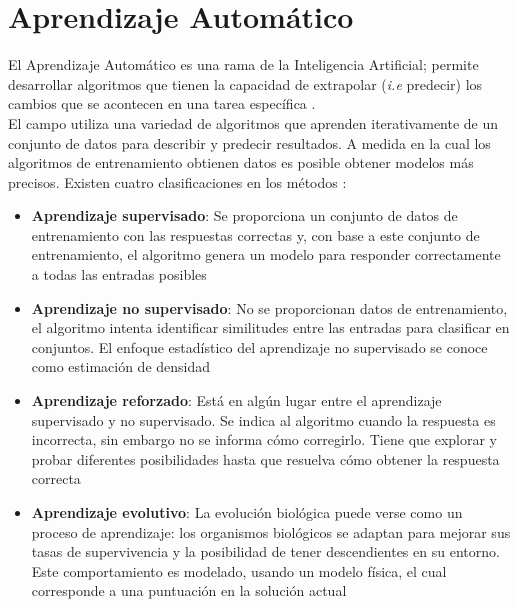 \section{Aprendizaje Automático}

El Aprendizaje Automático es una rama de la Inteligencia Artificial; permite desarrollar algoritmos que tienen la capacidad de extrapolar (\textit{i.e} predecir) los cambios que se acontecen en una tarea específica \citep{CT2}.\\

El campo utiliza una variedad de algoritmos que aprenden iterativamente de un conjunto de
datos para describir y predecir resultados. A medida en la cual los algoritmos de 
entrenamiento obtienen datos es posible obtener modelos más precisos. Existen cuatro clasificaciones en los métodos \citep{CT21}:

\begin{itemize}

	\item \textbf{Aprendizaje supervisado}: Se proporciona un conjunto de datos de entrenamiento con las respuestas correctas y, con base a este conjunto de 
	entrenamiento, el algoritmo genera un modelo para responder correctamente a todas 
	las entradas posibles

	\item \textbf{Aprendizaje no supervisado}: No se proporcionan datos de entrenamiento, el algoritmo intenta identificar similitudes entre las entradas para clasificar en conjuntos. El enfoque estadístico del aprendizaje no 
	supervisado se conoce como estimación de densidad

	\item \textbf{Aprendizaje reforzado}: Está en algún lugar entre el aprendizaje supervisado y no supervisado. Se indica al algoritmo cuando la respuesta es incorrecta, sin embargo no se informa
	cómo corregirlo. Tiene que explorar y probar diferentes posibilidades hasta que resuelva 
	cómo obtener la respuesta correcta

	\item \textbf{Aprendizaje evolutivo}: La evolución biológica puede verse como un proceso de aprendizaje: los organismos biológicos se adaptan para mejorar sus tasas de supervivencia 
	y la posibilidad de tener descendientes en su entorno. Este comportamiento es modelado, 
	usando un modelo física, el cual corresponde a una puntuación en la 
	solución actual

\end{itemize}

